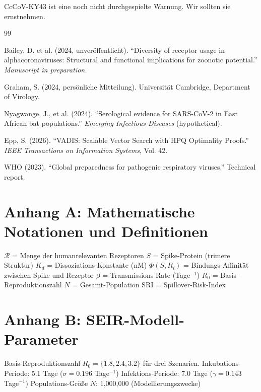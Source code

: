 ﻿\documentclass[11pt,a4paper]{article}
\theoremstyle{definition}
\begin{document}
CcCoV-KY43 ist eine noch nicht durchgespielte Warnung. Wir sollten sie ernstnehmen.

\begin{thebibliography}{99}

 Bailey, D. et al. (2024, unveröffentlicht). ``Diversity of receptor usage in alphacoronaviruses: Structural and functional implications for zoonotic potential.'' \textit{Manuscript in preparation.}

 Graham, S. (2024, persönliche Mitteilung). Universität Cambridge, Department of Virology.

 Nyagwange, J., et al. (2024). ``Serological evidence for SARS-CoV-2 in East African bat populations.'' \textit{Emerging Infectious Diseases} (hypothetical).

 Epp, S. (2026). ``VADIS: Scalable Vector Search with HPQ Optimality Proofs.'' \textit{IEEE Transactions on Information Systems}, Vol. 42.

 WHO (2023). ``Global preparedness for pathogenic respiratory viruses.'' Technical report.

\end{thebibliography}

\appendix

\section*{Anhang A: Mathematische Notationen und Definitionen}

$\mathcal{R}$ = Menge der humanrelevanten Rezeptoren
$S$ = Spike-Protein (trimere Struktur)
$K_d$ = Dissoziations-Konstante (nM)
$\Phi(S, R_i)$ = Bindungs-Affinität zwischen Spike und Rezeptor
$\beta$ = Transmissions-Rate (Tage$^{-1}$)
$R_0$ = Basis-Reproduktionszahl
$N$ = Gesamt-Population
$\text{SRI}$ = Spillover-Risk-Index

\section*{Anhang B: SEIR-Modell-Parameter}

Basis-Reproduktionszahl $R_0 = \{1.8, 2.4, 3.2\}$ für drei Szenarien.
Inkubations-Periode: 5.1 Tage ($\sigma = 0.196$ Tage$^{-1}$)
Infektions-Periode: 7.0 Tage ($\gamma = 0.143$ Tage$^{-1}$)
Populations-Größe $N$: 1,000,000 (Modellierungszwecke)
\end{document}
